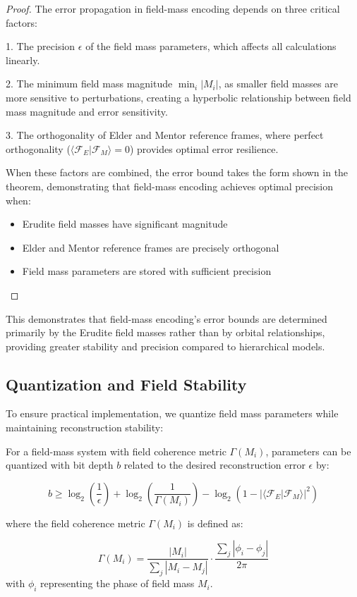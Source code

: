 \begin{proof}
The error propagation in field-mass encoding depends on three critical factors:

1. The precision $\epsilon$ of the field mass parameters, which affects all calculations linearly.

2. The minimum field mass magnitude $\min_i |M_i|$, as smaller field masses are more sensitive to perturbations, creating a hyperbolic relationship between field mass magnitude and error sensitivity.

3. The orthogonality of Elder and Mentor reference frames, where perfect orthogonality ($\langle \mathcal{F}_E|\mathcal{F}_M \rangle = 0$) provides optimal error resilience.

When these factors are combined, the error bound takes the form shown in the theorem, demonstrating that field-mass encoding achieves optimal precision when:
\begin{itemize}
    \item Erudite field masses have significant magnitude
    \item Elder and Mentor reference frames are precisely orthogonal
    \item Field mass parameters are stored with sufficient precision
\end{itemize}
\end{proof}

This demonstrates that field-mass encoding's error bounds are determined primarily by the Erudite field masses rather than by orbital relationships, providing greater stability and precision compared to hierarchical models.

\subsection{Quantization and Field Stability}

To ensure practical implementation, we quantize field mass parameters while maintaining reconstruction stability:

\begin{proposition}
For a field-mass system with field coherence metric $\Gamma(M_i)$, parameters can be quantized with bit depth $b$ related to the desired reconstruction error $\epsilon$ by:

\begin{equation}
b \geq \log_2\left(\frac{1}{\epsilon}\right) + \log_2\left(\frac{1}{\Gamma(M_i)}\right) - \log_2\left(1 - |\langle \mathcal{F}_E|\mathcal{F}_M \rangle|^2\right)
\end{equation}

where the field coherence metric $\Gamma(M_i)$ is defined as:

\begin{equation}
\Gamma(M_i) = \frac{|M_i|}{\sum_j |M_i - M_j|} \cdot \frac{\sum_j |\phi_i - \phi_j|}{2\pi}
\end{equation}
with $\phi_i$ representing the phase of field mass $M_i$.
\end{proposition}

